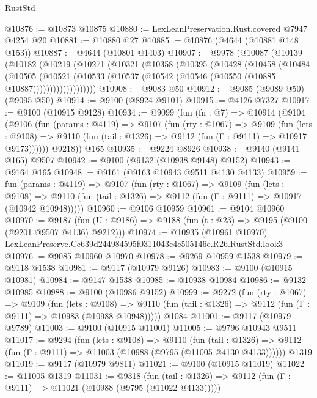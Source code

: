 \begin{lexlean}{RustStd}
\begin{coremodule}
@10876 := @10873 @10875
@10880 := LexLeanPreservation.Rust.covered @7947 @4254 @20
@10881 := @10880 @27
@10885 := @10876 (@4644 (@10881 @148 @153))
@10887 := @4644 (@10801 @1403)
@10907 := @9978
    (@10087
      (@10139
        (@10182
          (@10219
            (@10271
              (@10321
                (@10358
                  (@10395
                    (@10428
                      (@10458
                        (@10484
                          (@10505
                            (@10521
                              (@10533
                                (@10537 (@10542 (@10546 (@10550 (@10885 @10887)))))))))))))))))))
@10908 := @9083 @50
@10912 := @9085 (@9089 @50) (@9095 @50)
@10914 := @9100 (@8924 @9101)
@10915 := @4126 @7327
@10917 := @9100 (@10915 @9128)
@10934 := @9099
    (fun (fn : @7) =>
    @10914
      (@9104
        (@9106
          (fun (params : @4119) =>
          @9107
            (fun (rty : @1067) =>
            @9109
              (fun (lets : @9108) =>
              @9110 (fun (tail : @1326) => @9112 (fun (Γ : @9111) => @10917 @9173))))))
        @9218))
    @165
@10935 := @9224 @8926
@10938 := @9140 (@9141 @165) @9507
@10942 := @9100 (@9132 (@10938 @9148) @9152)
@10943 := @9164 @165
@10948 := @9161 (@9163 @10943 @9511 @4130 @4133)
@10959 := fun (params : @4119) =>
  @9107
    (fun (rty : @1067) =>
    @9109
      (fun (lets : @9108) =>
      @9110 (fun (tail : @1326) => @9112 (fun (Γ : @9111) => @10917 (@10942 @10948)))))
@10960 := @9106 @10959
@10961 := @9104 @10960
@10970 := @9187
    (fun (U : @9186) => @9188 (fun (t : @23) => @9195 (@9100 (@9201 @9507 @4136) @9212)))
@10974 := @10935 (@10961 @10970) LexLeanPreserve.Cc639d244984595f0311043c4c505146e.R26.RustStd.look3
@10976 := @9085 @10960 @10970
@10978 := @9269 @10959 @1538
@10979 := @9118 @1538
@10981 := @9117 (@10979 @9126)
@10983 := @9100 (@10915 @10981)
@10984 := @9147 @1538
@10985 := @10938 @10984
@10986 := @9132 @10985
@10988 := @9100 (@10986 @9152)
@10999 := @9272
    (fun (rty : @1067) =>
    @9109
      (fun (lets : @9108) =>
      @9110 (fun (tail : @1326) => @9112 (fun (Γ : @9111) => @10983 (@10988 @10948)))))
    @1084
@11001 := @9117 (@10979 @9789)
@11003 := @9100 (@10915 @11001)
@11005 := @9796 @10943 @9511
@11017 := @9294
    (fun (lets : @9108) =>
    @9110
      (fun (tail : @1326) =>
      @9112 (fun (Γ : @9111) => @11003 (@10988 (@9795 (@11005 @4130 @4133))))))
    @1319
@11019 := @9117 (@10979 @9811)
@11021 := @9100 (@10915 @11019)
@11022 := @11005 @1319
@11031 := @9318
    (fun (tail : @1326) => @9112 (fun (Γ : @9111) => @11021 (@10988 (@9795 (@11022 @4133)))))

\end{coremodule}
\end{lexlean}
